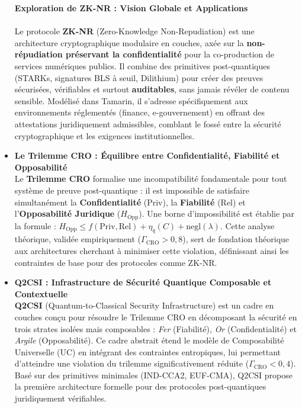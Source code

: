 \documentclass[11pt]{article}
\begin{document}
\begin{itemize}

 \textbf{Exploration de ZK-NR : Vision Globale et Applications} \\
    \\
    Le protocole \textbf{ZK-NR} (Zero-Knowledge Non-Repudiation) est une architecture cryptographique modulaire en couches, axée sur la \textbf{non-répudiation préservant la confidentialité} pour la co-production de services numériques publics. Il combine des primitives post-quantiques (STARKs, signatures BLS à seuil, Dilithium) pour créer des preuves sécurisées, vérifiables et surtout \textbf{auditables}, sans jamais révéler de contenu sensible. Modélisé dans Tamarin, il s'adresse spécifiquement aux environnements réglementés (finance, e-gouvernement) en offrant des attestations juridiquement admissibles, comblant le fossé entre la sécurité cryptographique et les exigences institutionnelles.

    \item \textbf{Le Trilemme CRO : Équilibre entre Confidentialité, Fiabilité et Opposabilité} \\
    Le \textbf{Trilemme CRO} formalise une incompatibilité fondamentale pour tout système de preuve post-quantique : il est impossible de satisfaire simultanément la \textbf{Confidentialité} ($\text{Priv}$), la \textbf{Fiabilité} ($\text{Rel}$) et l'\textbf{Opposabilité Juridique} ($H_{\text{Opp}}$). Une borne d'impossibilité est établie par la formule : $H_{\text{Opp}} \leq f(\text{Priv}, \text{Rel}) + \eta_q(C) + \text{negl}(\lambda)$. Cette analyse théorique, validée empiriquement ($\Gamma_{\text{CRO}} > 0,8$), sert de fondation théorique aux architectures cherchant à minimiser cette violation, définissant ainsi les contraintes de base pour des protocoles comme ZK-NR.
    
    \item \textbf{Q2CSI : Infrastructure de Sécurité Quantique Composable et Contextuelle} \\
    \textbf{Q2CSI} (Quantum-to-Classical Security Infrastructure) est un cadre en couches conçu pour résoudre le Trilemme CRO en décomposant la sécurité en trois strates isolées mais composables : \textit{Fer} (Fiabilité), \textit{Or} (Confidentialité) et \textit{Argile} (Opposabilité). Ce cadre abstrait étend le modèle de Composabilité Universelle (UC) en intégrant des contraintes entropiques, lui permettant d'atteindre une violation du trilemme significativement réduite ($\Gamma_{\text{CRO}} < 0,4$). Basé sur des primitives minimales (IND-CCA2, EUF-CMA), Q2CSI propose la première architecture formelle pour des protocoles post-quantiques juridiquement vérifiables.


\end{itemize}
\end{document}
